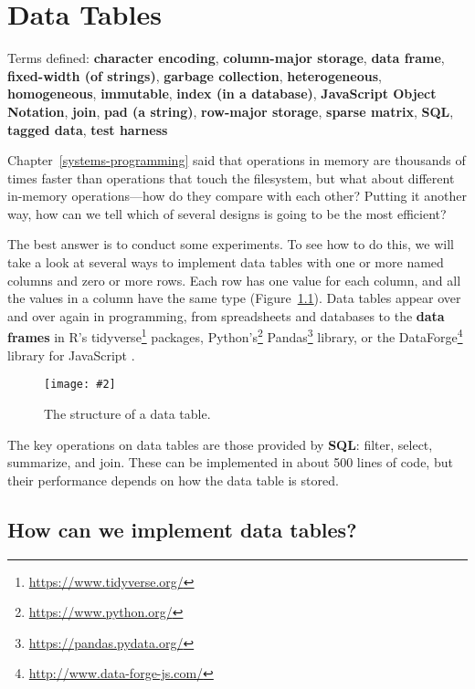 \documentclass[krantzl]{krantz}
\newcommand{\figpdf}[4]{\begin{figure}%
\centering%
\texttt{[image: \#2]}%
\caption{#3}%
\label{#1}%
\end{figure}}
\newcommand{\chapref}[1]{Chapter~\ref{#1}}
\newcommand{\figref}[1]{Figure~\ref{#1}}
\newcommand{\glossref}[1]{\textbf{#1}}
\newcommand{\hreffoot}[2]{{#1}\footnote{\href{#2}{#2}}}
\begin{document}
\chapter{Data Tables}\label{data-table}


\noindent 
  Terms defined: \glossref{character encoding}, \glossref{column-major storage}, \glossref{data frame}, \glossref{fixed-width (of strings)}, \glossref{garbage collection}, \glossref{heterogeneous}, \glossref{homogeneous}, \glossref{immutable}, \glossref{index (in a database)}, \glossref{JavaScript Object Notation}, \glossref{join}, \glossref{pad (a string)}, \glossref{row-major storage}, \glossref{sparse matrix}, \glossref{SQL}, \glossref{tagged data}, \glossref{test harness}



\chapref{systems-programming} said that
operations in memory are thousands of times faster than operations that touch the filesystem,
but what about different in-memory operations—how do they compare with each other?
Putting it another way,
how can we tell which of several designs is going to be the most efficient?


The best answer is to conduct some experiments.
To see how to do this,
we will take a look at several ways to implement data tables
with one or more named columns and zero or more rows.
Each row has one value for each column,
and all the values in a column have the same type
(\figref{data-table-conceptual}).
Data tables appear over and over again in programming,
from spreadsheets and databases
to the \glossref{data frames} in
R’s \hreffoot{tidyverse}{https://www.tidyverse.org/} packages,
\hreffoot{Python’s}{https://www.python.org/} \hreffoot{Pandas}{https://pandas.pydata.org/} library,
or the \hreffoot{DataForge}{http://www.data-forge-js.com/} library for JavaScript \cite{Davis2018}.

\figpdf{data-table-conceptual}{./data-table/conceptual.pdf}{The structure of a data table.}{0.6}


The key operations on data tables are those provided by \glossref{SQL}:
filter, select, summarize, and join.
These can be implemented in about 500 lines of code,
but their performance depends on how the data table is stored.

\section{How can we implement data tables?}\label{data-table-implement}
\end{document}

